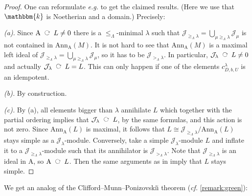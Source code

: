 \documentclass[a4paper,11pt]{amsart}
\newcommand{\eg}{\textsl{e.g.}}
\newcommand{\cf}{\textsl{cf.}}
\newcommand{\actsleft}{\mathop{\,\;\raisebox{1.7ex}{\rotatebox{-90}{$\circlearrowright$}}\;\,}}
\newcommand{\setstuff}[1]{\mathrm{#1}}
\newcommand{\KK}{\mathbbm{k}}
\numberwithin{equation}{section}
\let\fullref\autoref
\begin{document}
\begin{proof}
One can reformulate {\eg} \cite[Corollary 3.2]{KoXi-affine-cellular} 
to get the claimed results. (Here we use that $\KK$ is 
Noetherian and a domain.) Precisely:	

\textit{(a).} Since $\setstuff{A}\actsleft L\neq 0$ there 
is a $\leq_{\Lambda}$-minimal $\lambda$ such that 
$\mathcal{J}_{{\geq_{\Lambda}}\lambda}=
\bigcup_{\mu\geq_{\Lambda}\lambda}\mathcal{J}_{\mu}$ is not contained
in $\mathrm{Ann}_{\setstuff{A}}(M)$.
It is not hard to see 
that $\mathrm{Ann}_{\setstuff{A}}(M)$ is a maximal 
left ideal of $\mathcal{J}_{{\geq_{\Lambda}}\lambda}=
\bigcup_{\mu\geq_{\Lambda}\lambda}\mathcal{J}_{\mu}$, so it has to 
be $\mathcal{J}_{{>_{\Lambda}}\lambda}$. In particular, 
$\mathcal{J}_{\lambda}\actsleft L\neq 0$ and actually 
$\mathcal{J}_{\lambda}\actsleft L=L$. This can only happen 
if one of the elements $c_{D,b,U}^{\lambda}$ is an idempotent.

\textit{(b).} By construction.

\textit{(c).} By (a), all elements bigger than $\lambda$ 
annihilate $L$ which together with the partial ordering 
implies that $\mathcal{J}_{\lambda}\actsleft L$, by the same formulas, 
and this action is not zero. Since $\mathrm{Ann}_{\setstuff{A}}(L)$ 
is maximal, it follows that 
$L\cong\mathcal{J}_{{\geq_{\Lambda}}\lambda}/\mathrm{Ann}_{\setstuff{A}}(L)$
stays simple as a $\mathcal{J}_{\lambda}$-module.
Conversely, take a simple $\mathcal{J}_{\lambda}$-module $L$ 
and inflate it to a $\mathcal{J}_{{\geq_{\Lambda}}\lambda}$-module 
such that its annihilator is $\mathcal{J}_{{>_{\Lambda}}\lambda}$. 
Note that $\mathcal{J}_{{\geq_{\Lambda}}\lambda}$ is an ideal in 
$\setstuff{A}$, so $\setstuff{A}\actsleft L$.
Then the same arguments as in \cite[Lemma 3.1]{KoXi-affine-cellular} 
imply that $L$ stays simple.
\end{proof}

We get an analog of the Clifford--Munn--Ponizovski\u{\i} theorem ({\cf} 
\fullref{remark:green}):
\end{document}
